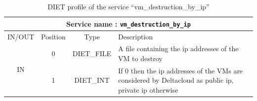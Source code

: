 \begin{table}[h!]
\begin{tabular}{|c|c|c|p{}|} 
  \hline
  \multicolumn{4}{|c|}{Service name : \textbf{\texttt{vm\_destruction\_by\_ip}}} \\
  \hline
    IN/OUT & Position & Type & Description \\
    \hline
    \multirow{2}{*}{IN} & 0 & DIET\_FILE & A file containing the ip addresses of the VM to destroy\\
    \cline{2-4}
                        & 1 & DIET\_INT & If 0 then the ip addresses of the VMs are considered by Deltacloud as public ip, private ip otherwise\\
    \hline
\end{tabular}
\caption{DIET profile of the service ``vm\_destruction\_by\_ip''}
\label{tab:vm-destruction-by-ip}
\end{table}
